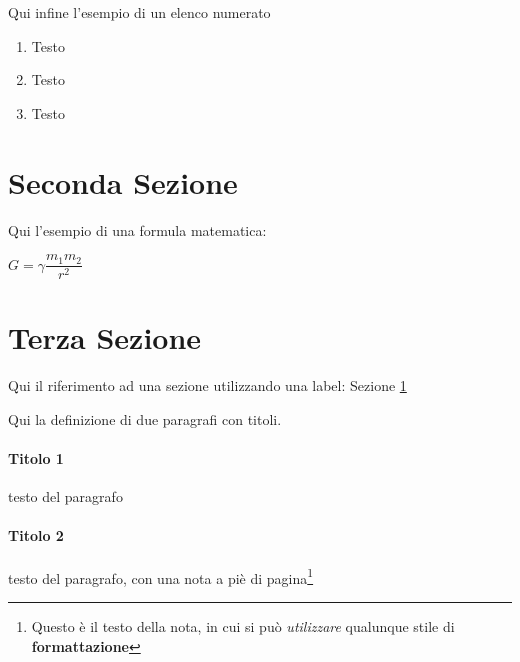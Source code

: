 Qui infine l'esempio di un elenco numerato

\begin{enumerate}
\item Testo
\item Testo
\item Testo
\end{enumerate}

\section{Seconda Sezione}\label{sec:Sezione2}

Qui l'esempio di una formula matematica:

$ G = \gamma\dfrac{m_{1}m_{2}}{r^{2}} $

\section{Terza Sezione}

Qui il riferimento ad una sezione utilizzando una label: Sezione \ref{sec:Sezione2}

Qui la definizione di due paragrafi con titoli.

\paragraph{Titolo 1} testo del paragrafo

\paragraph{Titolo 2} testo del paragrafo, con una nota a piè di pagina\footnote{Questo è il testo della nota, in cui si può \textit{utilizzare} qualunque stile di \textbf{formattazione}}


